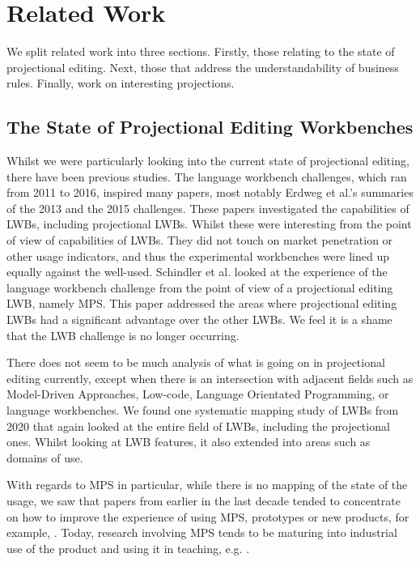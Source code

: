 \chapter{Related Work}
\label{chapter:RelatedWork}

We split related work into three sections. 
Firstly, those relating to the state of projectional editing.
Next, those that address the understandability of business rules.
Finally, work on interesting projections.

\section{The State of Projectional Editing Workbenches}

Whilst we were particularly looking into the current state of projectional editing, there have been previous studies.
The language workbench challenges, which ran from 2011 to 2016, inspired many papers, most notably Erdweg et al.'s summaries of the 2013\cite{erdweg2013state} and the 2015\cite{erdweg2015evaluating} challenges.
These papers investigated the capabilities of LWBs, including projectional LWBs.
Whilst these were interesting from the point of view of capabilities of LWBs. 
They did not touch on market penetration or other usage indicators, and thus the experimental workbenches were lined up equally against the well-used.
Schindler et al.\cite{schindler2016language} looked at the experience of the language workbench challenge from the point of view of a projectional editing LWB, namely MPS.
This paper addressed the areas where projectional editing LWBs had a significant advantage over the other LWBs. 
We feel it is a shame that the LWB challenge is no longer occurring.

There does not seem to be much analysis of what is going on in projectional editing currently, except when there is an intersection with adjacent fields such as Model-Driven Approaches, Low-code, Language Orientated Programming, or language workbenches.
We found one systematic mapping study of LWBs\cite{iung2020systematic} from 2020 that again looked at the entire field of LWBs, including the projectional ones.
Whilst looking at LWB features, it also extended into areas such as domains of use.

With regards to MPS in particular, while there is no mapping of the state of the usage, we saw that papers from earlier in the last decade tended to concentrate on how to improve the experience of using MPS, prototypes or new products, for example, \cite{pavletic2013extensible,voelter2014generic,voelter2015using,voelter2010language2,voelter2013mbeddr,voelter2013requirements,voelter2014projecting,voelter2015towards,voelter2010embedded,voelter2011product,ratiu2012implementing}.
Today, research involving MPS tends to be maturing into industrial use of the product and using it in teaching, e.g. \cite{prinz2021teaching,voelterdomain_SLR, schindler2021jetbrains_SLR,simi2021learning_SLR,barash2021teaching_SLR,stotz2021migrating_SLR,ratiu2021use}.

